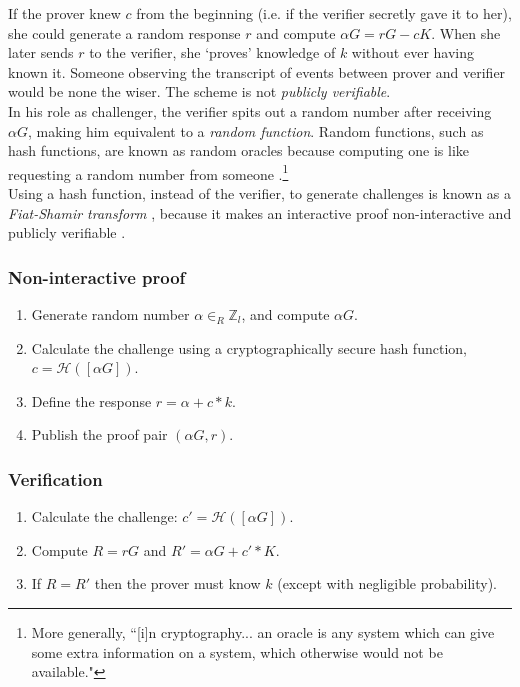 If the prover knew $c$ from the beginning (i.e. if the verifier secretly gave it to her), she could generate a random response $r$ and compute $\alpha G = r G - c K$. When she later sends $r$ to the verifier, she `proves' knowledge of $k$ without ever having known it. Someone observing the transcript of events between prover and verifier would be none the wiser. The scheme is not {\em publicly verifiable}. \cite{Signatures2015BorromeanRS}\\

In his role as challenger, the verifier spits out a random number after receiving $\alpha G$, making him equivalent to a {\em random function}. Random functions, such as hash functions, are known as random oracles because computing one is like requesting a random number from someone \cite{Signatures2015BorromeanRS}.\footnote{More generally, ``[i]n cryptography... an oracle is any system which can give some extra information on a system, which otherwise would not be available."\cite{cryptographic-oracle}}\\

Using a hash function, instead of the verifier, to generate challenges is known as a {\em Fiat-Shamir transform} \cite{fiat-shamir-transform}, because it makes an interactive proof non-interactive and publicly verifiable \cite{Signatures2015BorromeanRS}.


\subsubsection*{Non-interactive proof}

\begin{enumerate}
	\item Generate random number $\alpha \in_R \mathbb{Z}_l$, and compute $\alpha G$.
	\item Calculate the challenge using a cryptographically secure hash function, \(c = \mathcal{H}([\alpha G])\).
	\item Define the response $r = \alpha + c*k$.
	\item Publish the proof pair $(\alpha G, r)$.
\end{enumerate}


\subsubsection*{Verification}

\begin{enumerate}
	\item Calculate the challenge: \(c' = \mathcal{H}([\alpha G])\).
	\item Compute $R = r G$ and $R' = \alpha G + c'*K$.
	\item If $R = R'$ then the prover must know $k$ (except with negligible probability).
\end{enumerate}

